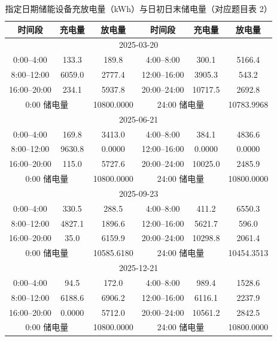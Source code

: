 \begin{table}[H]
  \centering
  \caption{指定日期储能设备充放电量（kWh）与日初日末储电量（对应题目表 2）}
  \label{tab:q2-t2}
  \small
  \setlength{\tabcolsep}{4pt}
  \begin{tabular}{|c|c|c|c|c|c|}
    \hline
    时间段 & 充电量 & 放电量 & 时间段 & 充电量 & 放电量 \\ \hline
    \multicolumn{6}{|c|}{2025-03-20} \\ \hline
    0:00--4:00   & 133.3  & 189.8   & 4:00--8:00   & 300.1   & 5166.4 \\ \hline
    8:00--12:00  & 6059.0 & 2777.4  & 12:00--16:00 & 3905.3  & 543.2 \\ \hline
    16:00--20:00 & 234.1  & 5937.8  & 20:00--24:00 & 10717.5 & 2692.8 \\ \hline
    \multicolumn{2}{|c|}{0:00 储电量} & 10800.0000
      & \multicolumn{2}{c|}{24:00 储电量} & 10783.9968 \\ \hline
    \multicolumn{6}{|c|}{2025-06-21} \\ \hline
    0:00--4:00   & 169.8   & 3413.0  & 4:00--8:00   & 384.1   & 4836.6 \\ \hline
    8:00--12:00  & 9630.8  & 0.0000  & 12:00--16:00 & 0.0000  & 0.0000 \\ \hline
    16:00--20:00 & 115.0   & 5727.6  & 20:00--24:00 & 10025.0 & 2485.9 \\ \hline
    \multicolumn{2}{|c|}{0:00 储电量} & 10800.0000
      & \multicolumn{2}{c|}{24:00 储电量} & 10800.0000 \\ \hline
    \multicolumn{6}{|c|}{2025-09-23} \\ \hline
    0:00--4:00   & 330.5  & 288.5   & 4:00--8:00   & 411.2   & 6550.3 \\ \hline
    8:00--12:00  & 4827.1 & 1896.6  & 12:00--16:00 & 5621.7  & 596.0 \\ \hline
    16:00--20:00 & 35.0   & 6159.9  & 20:00--24:00 & 10298.8 & 2061.4 \\ \hline
    \multicolumn{2}{|c|}{0:00 储电量} & 10585.6180
      & \multicolumn{2}{c|}{24:00 储电量} & 10454.3513 \\ \hline
    \multicolumn{6}{|c|}{2025-12-21} \\ \hline
    0:00--4:00   & 94.5   & 172.0   & 4:00--8:00   & 989.4   & 1528.6 \\ \hline
    8:00--12:00  & 6188.6 & 6906.2  & 12:00--16:00 & 6116.1  & 2237.9 \\ \hline
    16:00--20:00 & 0.0000 & 5712.0  & 20:00--24:00 & 10561.2 & 2842.5 \\ \hline
    \multicolumn{2}{|c|}{0:00 储电量} & 10800.0000
      & \multicolumn{2}{c|}{24:00 储电量} & 10800.0000 \\ \hline
  \end{tabular}
\end{table}

